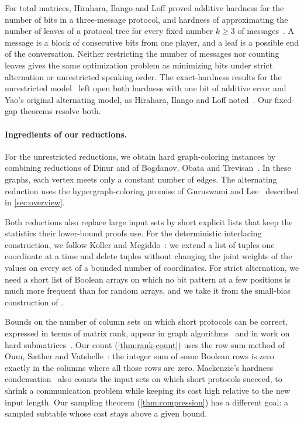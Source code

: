 \documentclass[11pt,letterpaper]{article} \usepackage[utf8]{inputenc}
\theoremstyle{plain} \newtheorem{theorem}{Theorem}[section]
\theoremstyle{definition} \newaliascnt{definition}{theorem}
\begin{document}
For total matrices,
Hirahara, Ilango and Loff proved additive hardness for the number of
bits in a three-message protocol, and hardness of approximating the
number of leaves of a protocol tree for every fixed number $k\ge3$ of
messages~\cite{hirahara2021constant}. A message is a block of
consecutive bits from one player, and a leaf is a possible end of the
conversation. Neither restricting the number of messages nor counting
leaves gives the same optimization problem as minimizing bits under
strict alternation or unrestricted speaking order. The exact-hardness
results for the unrestricted
model~\cite{gaspers-he-mackenzie-npcc,hirahara2025communication} left open
both hardness with one bit of additive error and Yao's original
alternating model, as Hirahara, Ilango and Loff
noted~\cite{hirahara2025communication}. Our fixed-gap theorems resolve both.

\paragraph{Ingredients of our reductions.}
For the unrestricted reductions, we obtain hard graph-coloring instances
by combining reductions of Dinur and of Bogdanov, Obata and
Trevisan~\cite{dinur2007pcp,bogdanov2002lower}. In these graphs, each
vertex meets only a constant number of edges. The alternating reduction
uses the hypergraph-coloring promise of Guruswami and
Lee~\cite{guruswami2018balanced} described in \cref{sec:overview}.

Both reductions also replace large input sets by short explicit lists
that keep the statistics their lower-bound proofs use. For the deterministic
interlacing construction, we follow Koller and
Megiddo~\cite[Section~3]{koller1994sample}: we extend a list of tuples one
coordinate at a time and delete tuples without changing the joint
weights of the values on every set of a bounded number of coordinates. For strict alternation, we need a short list of Boolean arrays on which
no bit pattern at a few positions is much more frequent than for random
arrays, and we take it from the small-bias construction of
\citet{alon1992smallbias}.

Bounds on the number of column sets on which short protocols can be
correct, expressed in terms of matrix rank, appear in graph algorithms~\cite{bui2010rankwidth,oum2014faster}
and in work on hard submatrices~\cite{hrubes2025hard}. Our count (\cref{thm:rank-count}) uses the
row-sum method of Oum, S{\ae}ther and
Vatshelle~\cite{oum2014faster}: the integer sum of some Boolean rows is zero
exactly in the columns where all those rows are zero. Mackenzie's hardness
condensation~\cite{mackenzie2026condensation} also counts the input sets
on which short protocols succeed, to shrink a communication problem while
keeping its cost high relative to the new input length. Our sampling
theorem (\cref{thm:compression}) has a different goal: a sampled
subtable whose cost stays above a given bound.
\end{document}
